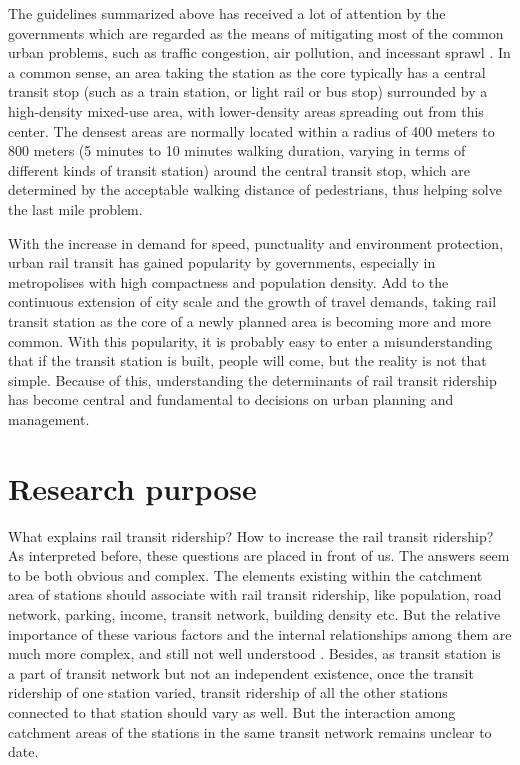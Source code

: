 The guidelines summarized above has received a lot of attention by the governments which are regarded as the means of mitigating most of the common urban problems, such as traffic congestion, air pollution, and incessant sprawl \cite{cervero2002transit}. In a common sense, an area taking the station as the core typically has a central transit stop (such as a train station, or light rail or bus stop) surrounded by a high-density mixed-use area, with lower-density areas spreading out from this center. The densest areas are normally located within a radius of 400 meters to 800 meters (5 minutes to 10 minutes walking duration, varying in terms of different kinds of transit station) around the central transit stop, which are determined by the acceptable walking distance of pedestrians, thus helping solve the last mile problem.

With the increase in demand for speed, punctuality and environment protection, urban rail transit has gained popularity by governments, especially in metropolises with high compactness and population density. Add to the continuous extension of city scale and the growth of travel demands, taking rail transit station as the core of a newly planned area is becoming more and more common. With this popularity, it is probably easy to enter a misunderstanding that if the transit station is built, people will come, but the reality is not that simple. Because of this, understanding the determinants of rail transit ridership has become central and fundamental to decisions on urban planning and management. 

% 
\section{Research purpose}
What explains rail transit ridership? How to increase the rail transit ridership? As interpreted before, these questions are placed in front of us. The answers seem to be both obvious and complex. The elements existing within the catchment area of stations should associate with rail transit ridership, like population, road network, parking, income, transit network, building density etc. But the relative importance of these various factors and the internal relationships among them are much more complex, and still not well understood \cite{taylor2003factors}. Besides, as transit station is a part of transit network but not an independent existence, once the transit ridership of one station varied, transit ridership of all the other stations connected to that station should vary as well. But the interaction among catchment areas of the stations in the same transit network remains unclear to date.

